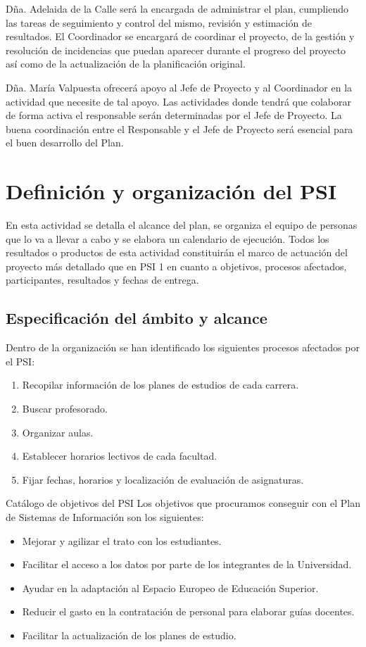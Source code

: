 \documentclass[12pt,a4paper,spanish,twoside]{book}
\begin{document}
\begin{enumerate}
\begin{itemize}
Dña. Adelaida de la Calle será la encargada de administrar el plan,
cumpliendo las tareas de seguimiento y control del mismo, revisión y 
estimación de resultados. El Coordinador se encargará de coordinar el
proyecto, de la gestión y resolución de incidencias que puedan aparecer 
durante el progreso del proyecto así como de la actualización de la 
planificación original.

Dña. María Valpuesta ofrecerá apoyo al Jefe de Proyecto y al Coordinador en
la actividad que necesite de tal apoyo. Las actividades donde tendrá que 
colaborar de forma activa el responsable serán determinadas por el Jefe de 
Proyecto. La buena coordinación entre el Responsable y el Jefe de Proyecto 
será esencial para el buen desarrollo del Plan.

\chapter{Definición y organización del PSI}
En esta actividad se detalla el alcance del plan, se organiza el equipo de
personas que lo va a llevar a cabo y se elabora un calendario de
ejecución. Todos los resultados o productos de esta actividad constituirán el
marco de actuación del proyecto más detallado que en PSI 1 en cuanto a
objetivos, procesos afectados, participantes, resultados y fechas de
entrega. 

\section{Especificación del ámbito y alcance}
Dentro de la organización se han identificado los siguientes procesos afectados 
por el PSI:
\begin{enumerate}
  \item Recopilar información de los planes de estudios de cada carrera.
  \item Buscar profesorado.
  \item Organizar aulas.
  \item Establecer horarios lectivos de cada facultad.
  \item Fijar fechas, horarios y localización de evaluación de asignaturas.
\end{enumerate}

Catálogo de objetivos del PSI
Los objetivos que procuramos conseguir con el Plan de Sistemas de Información 
son los siguientes:
\begin{itemize}
  \item Mejorar y agilizar el trato con los estudiantes.
  \item Facilitar el acceso a los datos por parte de los integrantes de la 
Universidad.
  \item Ayudar en la adaptación al Espacio Europeo de Educación Superior.
  \item Reducir el gasto en la contratación de personal para elaborar guías 
docentes.
  \item Facilitar la actualización de los planes de estudio.
\end{itemize}


\end{itemize}
\end{enumerate}
\end{document}
